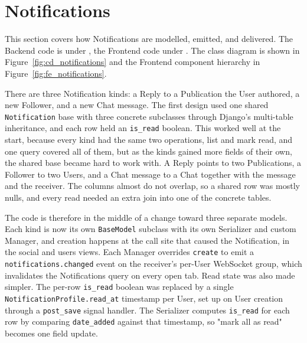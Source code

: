 %


\section{Notifications}
This section covers how Notifications are modelled, emitted, and
delivered. The Backend code is under
, the Frontend code under
. The class
diagram is shown in Figure~\ref{fig:cd_notifications} and the
Frontend component hierarchy in Figure~\ref{fig:fe_notifications}.

There are three Notification kinds: a Reply to a Publication the User
authored, a new Follower, and a new Chat message. The first design
used one shared \texttt{Notification} base with three concrete
subclasses through Django's multi-table inheritance, and each row
held an \texttt{is\_read} boolean. This worked well at the start,
because every kind had the same two operations, list and mark read,
and one query covered all of them, but as the kinds gained more fields of
their own, the shared base became hard to work with. A Reply points to two
Publications, a Follower to two Users, and a Chat message to a Chat
together with the message and the receiver. The columns almost do not
overlap, so a shared row was mostly nulls, and every read needed an
extra join into one of the concrete tables.

The code is therefore in the middle of a change toward three separate
models. Each kind is now its own \texttt{BaseModel} subclass with its
own Serializer and custom Manager, and creation happens at the call
site that caused the Notification, in the social and users views.
Each Manager overrides \texttt{create} to emit a
\texttt{notifications.changed} event on the receiver's per-User
WebSocket group, which invalidates the Notifications query on every
open tab. Read state was also made simpler. The per-row
\texttt{is\_read} boolean was replaced by a single
\texttt{NotificationProfile.read\_at} timestamp per User, set up on
User creation through a \texttt{post\_save} signal handler. The
Serializer computes \texttt{is\_read} for each row by comparing
\texttt{date\_added} against that timestamp, so "mark all as read"
becomes one field update.

